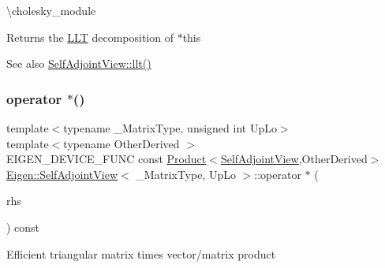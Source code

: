 \textbackslash{}cholesky\+\_\+module \begin{DoxyReturn}{Returns}
the \mbox{\hyperlink{class_eigen_1_1_l_l_t}{L\+LT}} decomposition of {\ttfamily $\ast$this} 
\end{DoxyReturn}
\begin{DoxySeeAlso}{See also}
\mbox{\hyperlink{class_eigen_1_1_self_adjoint_view_a405e810491642a7f7b785f2ad6f93619}{Self\+Adjoint\+View\+::llt()}} 
\end{DoxySeeAlso}
\mbox{\label{class_eigen_1_1_self_adjoint_view_a7a666957867c422c8b3e0fb4413a2e49}} 
\subsubsection{\texorpdfstring{operator $\ast$()}{operator *()}}
{\footnotesize\ttfamily template$<$typename \+\_\+\+Matrix\+Type, unsigned int Up\+Lo$>$ \\
template$<$typename Other\+Derived $>$ \\
E\+I\+G\+E\+N\+\_\+\+D\+E\+V\+I\+C\+E\+\_\+\+F\+U\+NC const \mbox{\hyperlink{class_eigen_1_1_product}{Product}}$<$\mbox{\hyperlink{class_eigen_1_1_self_adjoint_view}{Self\+Adjoint\+View}},Other\+Derived$>$ \mbox{\hyperlink{class_eigen_1_1_self_adjoint_view}{Eigen\+::\+Self\+Adjoint\+View}}$<$ \+\_\+\+Matrix\+Type, Up\+Lo $>$\+::operator $\ast$ (\begin{DoxyParamCaption}\item[{const \mbox{\hyperlink{class_eigen_1_1_matrix_base}{Matrix\+Base}}$<$ Other\+Derived $>$ \&}]{rhs }\end{DoxyParamCaption}) const\hspace{0.3cm}{\ttfamily [inline]}}

Efficient triangular matrix times vector/matrix product \mbox{\label{class_eigen_1_1_self_adjoint_view_a12a7da482e31ec9c517dca92dd7bae61}} 
